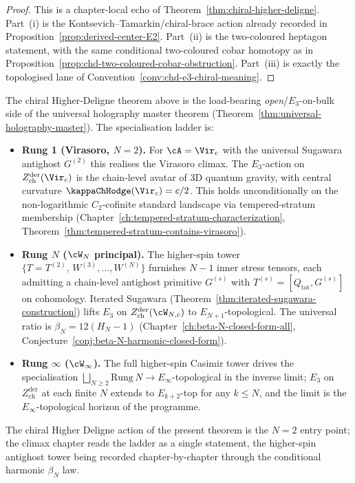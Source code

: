 \begin{proof}
This is a chapter-local echo of
Theorem~\ref{thm:chiral-higher-deligne}. Part~(i) is the
Kontsevich--Tamarkin/chiral-brace action already recorded in
Proposition~\ref{prop:derived-center-E2}. Part~(ii) is the
two-coloured heptagon statement, with the same conditional
two-coloured cobar homotopy as in
Proposition~\ref{prop:chd-two-coloured-cobar-obstruction}. Part~(iii) is exactly
the topologised lane of Convention~\ref{conv:chd-e3-chiral-meaning}.
\end{proof}

\begin{remark}%
\label{rem:higher-deligne-climax-placement}%
%
%
%
The chiral Higher-Deligne theorem above is the load-bearing
\emph{open}/$E_3$-on-bulk side of the universal holography master
theorem (Theorem~\ref{thm:universal-holography-master}). The
specialisation ladder is:
\begin{itemize}[nosep]
\item \textbf{Rung 1 (Virasoro, $N=2$).} For $\cA = \Vir_c$
 with the universal Sugawara antighost $G^{(2)}$ this realises the Virasoro
 climax. The $E_3$-action on $Z^{\mathrm{der}}_{\mathrm{ch}}(\Vir_c)$ is
 the chain-level avatar of 3D quantum gravity, with central curvature
 $\kappaChHodge(\Vir_c) = c/2$. This
 holds unconditionally on the non-logarithmic $C_2$-cofinite standard
 landscape via tempered-stratum membership
 (Chapter~\ref{ch:tempered-stratum-characterization},
 Theorem~\ref{thm:tempered-stratum-contains-virasoro}).
\item \textbf{Rung $N$ ($\cW_N$ principal).}
 The higher-spin tower
 $\{T = T^{(2)},\,W^{(3)},\ldots,W^{(N)}\}$ furnishes
 $N{-}1$ inner stress tensors, each admitting a chain-level antighost
 primitive $G^{(s)}$ with $T^{(s)} = [Q_{\mathrm{tot}}, G^{(s)}]$ on
 cohomology. Iterated Sugawara
 (Theorem~\ref{thm:iterated-sugawara-construction}) lifts $E_3$ on
 $Z^{\mathrm{der}}_{\mathrm{ch}}(\cW_{N,c})$ to $E_{N+1}$-topological. The
 universal ratio is $\beta_N = 12(H_N - 1)$
 (Chapter~\ref{ch:beta-N-closed-form-all},
 Conjecture~\ref{conj:beta-N-harmonic-closed-form}).
\item \textbf{Rung $\infty$ ($\cW_\infty$).}
 The full higher-spin Casimir tower drives the
 specialisation $\bigsqcup_{N\ge 2} \mathrm{Rung}\,N \to E_\infty$-topological
 in the inverse limit; $E_3$ on $Z^{\mathrm{der}}_{\mathrm{ch}}$ at
 each finite $N$ extends to $E_{k+2}$-top for any $k \le N$, and the
 limit is the $E_\infty$-topological horizon of the programme.
\end{itemize}
The chiral Higher Deligne action of the present theorem is the
$N=2$ entry point; the climax chapter reads the
ladder as a single statement, the higher-spin antighost tower being
recorded chapter-by-chapter through the conditional harmonic
$\beta_N$ law.
\end{remark}

